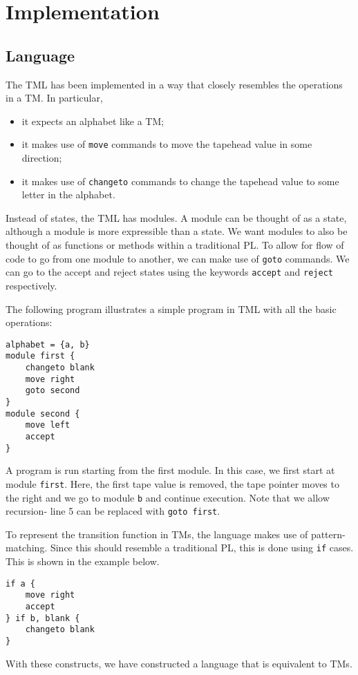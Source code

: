 \chapter{Implementation}
\section{Language}

The TML has been implemented in a way that closely resembles the operations in a TM. In particular, 
\begin{itemize}
    \item it expects an alphabet like a TM;
    \item it makes use of \texttt{move} commands to move the tapehead value in some direction;
    \item it makes use of \texttt{changeto} commands to change the tapehead value to some letter in the alphabet.
\end{itemize}
Instead of states, the TML has modules. A module can be thought of as a state, although a module is more expressible than a state. We want modules to also be thought of as functions or methods within a traditional PL. To allow for flow of code to go from one module to another, we can make use of \texttt{goto} commands. We can go to the accept and reject states using the keywords \texttt{accept} and \texttt{reject} respectively.

The following program illustrates a simple program in TML with all the basic operations:
\begin{lstlisting}[language=TML]
alphabet = {a, b}
module first {
    changeto blank
    move right
    goto second
}
module second {
    move left
    accept
}
\end{lstlisting}
A program is run starting from the first module. In this case, we first start at module \texttt{first}. Here, the first tape value is removed, the tape pointer moves to the right and we go to module \texttt{b} and continue execution. Note that we allow recursion- line 5 can be replaced with \texttt{goto first}.

To represent the transition function in TMs, the language makes use of pattern-matching. Since this should resemble a traditional PL, this is done using \texttt{if} cases. This is shown in the example below.
\begin{lstlisting}[language=TML]
if a {
    move right
    accept
} if b, blank {
    changeto blank
}
\end{lstlisting}
With these constructs, we have constructed a language that is equivalent to TMs. 

